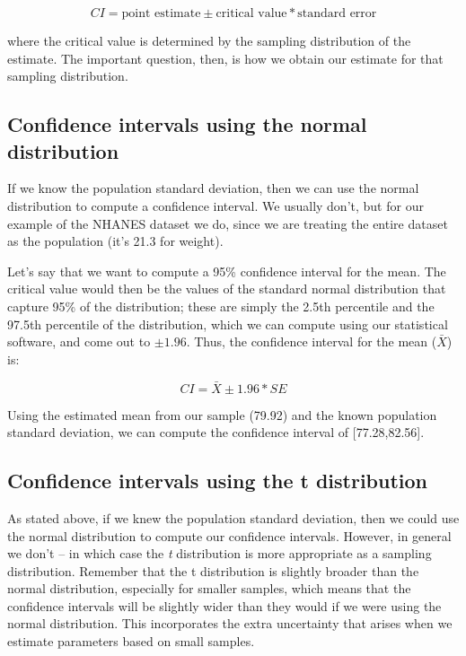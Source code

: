 \documentclass[
  12pt,
]{book}
\begin{document}
\[
CI = \text{point estimate} \pm \text{critical value} * \text{standard error}
\]

where the critical value is determined by the sampling distribution of the estimate. The important question, then, is how we obtain our estimate for that sampling distribution.

\hypertarget{confidence-intervals-using-the-normal-distribution}{%
\subsection{Confidence intervals using the normal distribution}\label{confidence-intervals-using-the-normal-distribution}}

If we know the population standard deviation, then we can use the normal distribution to compute a confidence interval. We usually don't, but for our example of the NHANES dataset we do, since we are treating the entire dataset as the population (it's 21.3 for weight).

Let's say that we want to compute a 95\% confidence interval for the mean. The critical value would then be the values of the standard normal distribution that capture 95\% of the distribution; these are simply the 2.5th percentile and the 97.5th percentile of the distribution, which we can compute using our statistical software, and come out to \(\pm 1.96\). Thus, the confidence interval for the mean (\(\bar{X}\)) is:

\[
CI = \bar{X} \pm 1.96*SE
\]

Using the estimated mean from our sample (79.92) and the known population standard deviation, we can compute the confidence interval of {[}77.28,82.56{]}.

\hypertarget{confidence-intervals-using-the-t-distribution}{%
\subsection{Confidence intervals using the t distribution}\label{confidence-intervals-using-the-t-distribution}}

As stated above, if we knew the population standard deviation, then we could use the normal distribution to compute our confidence intervals. However, in general we don't -- in which case the \emph{t} distribution is more appropriate as a sampling distribution. Remember that the t distribution is slightly broader than the normal distribution, especially for smaller samples, which means that the confidence intervals will be slightly wider than they would if we were using the normal distribution. This incorporates the extra uncertainty that arises when we estimate parameters based on small samples.
\end{document}
